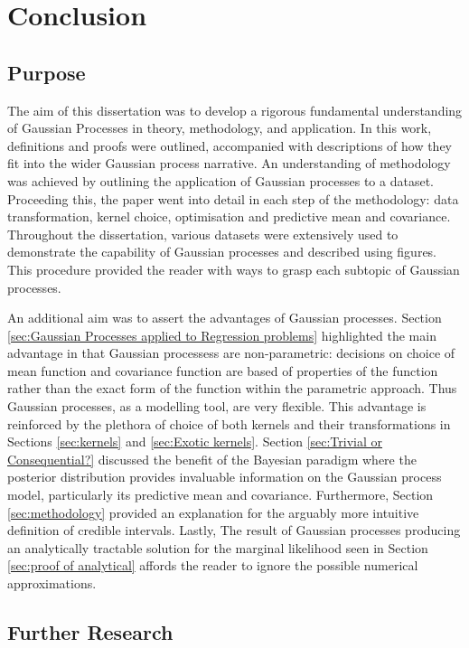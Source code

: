 \documentclass[12pt,a4paper]{article}
\begin{document}
\clearpage
\section{Conclusion}
\subsection{Purpose}

The aim of this dissertation was to develop a rigorous fundamental understanding of Gaussian Processes in theory, methodology, and application. In this work, definitions and proofs were outlined, accompanied with descriptions of how they fit into the wider Gaussian process narrative. An understanding of methodology was achieved by outlining  the application of Gaussian processes to a dataset. Proceeding this, the paper went into detail in each step of the methodology: data transformation, kernel choice, optimisation and predictive mean and covariance. Throughout the dissertation, various datasets were extensively used to demonstrate the capability of Gaussian processes and described using figures. This procedure provided the reader with ways to grasp each subtopic of Gaussian processes.  

An additional aim was to assert the advantages of Gaussian processes. Section \ref{sec:Gaussian Processes applied to Regression problems} highlighted the main advantage in that Gaussian processess are non-parametric: decisions on choice of mean function and covariance function are based of properties of the function rather than the exact form of the function within the parametric approach. Thus Gaussian processes, as a modelling tool, are very flexible. This advantage is reinforced by the plethora of choice of both kernels and their transformations in Sections \ref{sec:kernels} and \ref{sec:Exotic kernels}. Section \ref{sec:Trivial or Consequential?} discussed the benefit of the Bayesian paradigm where the posterior distribution provides invaluable information on the Gaussian process model, particularly its predictive mean and covariance. Furthermore, Section \ref{sec:methodology} provided an explanation for the arguably more intuitive definition of credible intervals. Lastly, The result of Gaussian processes producing an analytically tractable solution for the marginal likelihood seen in Section \ref{sec:proof of analytical} affords the reader to ignore the possible numerical approximations.

\subsection{Further Research}
\end{document}
